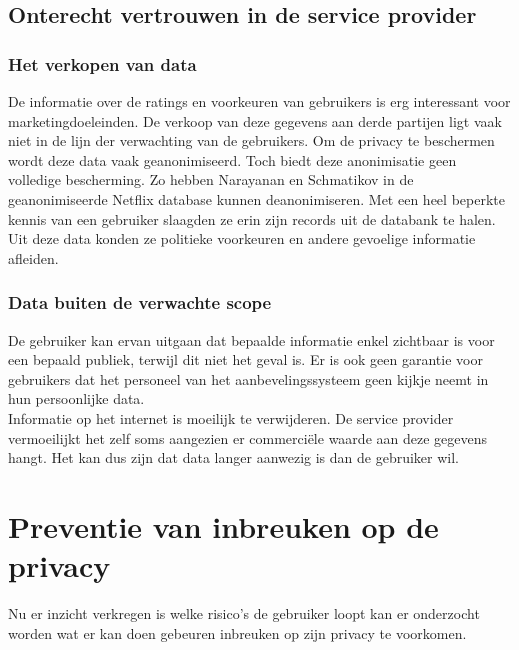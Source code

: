 \subsection{Onterecht vertrouwen in de service provider}
\label{onterecht_vertrouwen}
\subsubsection{Het verkopen van data}
De informatie over de ratings en voorkeuren van gebruikers is erg interessant voor marketingdoeleinden. De verkoop van deze gegevens aan derde partijen ligt vaak niet in de lijn der verwachting van de gebruikers. Om de privacy te beschermen wordt deze data vaak geanonimiseerd. Toch biedt deze anonimisatie geen volledige bescherming. Zo hebben Narayanan en Schmatikov in \cite{Narayanan2008} de geanonimiseerde Netflix database kunnen deanonimiseren. Met een heel beperkte kennis van een gebruiker slaagden ze erin zijn records uit de databank te halen. Uit deze data konden ze politieke voorkeuren en andere gevoelige informatie afleiden.
\subsubsection{Data buiten de verwachte scope \cite{pirs}}
De gebruiker kan ervan uitgaan dat bepaalde informatie enkel zichtbaar is voor een bepaald publiek, terwijl dit niet het geval is. Er is ook geen garantie voor gebruikers dat het personeel van het aanbevelingssysteem geen kijkje neemt in hun persoonlijke data.\\

Informatie op het internet is moeilijk te verwijderen. De service provider vermoeilijkt het zelf soms aangezien er commerci\"ele waarde aan deze gegevens hangt. Het kan dus zijn dat data langer aanwezig is dan de gebruiker wil.


\section{Preventie van inbreuken op de privacy}
Nu er inzicht verkregen is welke risico's de gebruiker loopt kan er onderzocht worden wat er kan doen gebeuren inbreuken op zijn privacy te voorkomen.






